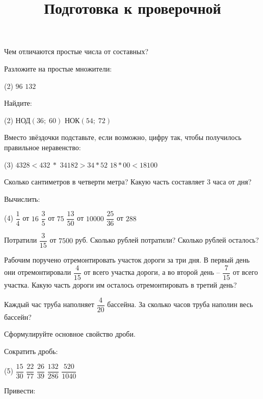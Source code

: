 \begin{class}[number=7]
	\title{Подготовка к проверочной}
	\begin{listofex}
	\item Чем отличаются простые числа от составных?
	\item Разложите на простые множители:
	\begin{tasks}(2)
		\task \( 96 \)
		\task \( 132 \)
	\end{tasks}
	\item Найдите:
	\begin{tasks}(2)
		\task НОД\( (36;\;60) \)
		\task НОК\( (54;\;72) \)
	\end{tasks}
	\item Вместо звёздочки подставьте, если возможно, цифру так, чтобы получилось правильное
	неравенство:
	\begin{tasks}(3)
		\task \( 4328 < 432\:* \)
		\task \( 34182 > 34*52 \)
		\task \( 18*00 < 18100 \)
	\end{tasks}
	\item Сколько сантиметров в четверти метра? Какую часть составляет 3 часа от дня?
	\item Вычислить:
	\begin{tasks}(4)
		\task \( \dfrac{1}{4} \) от \( 16 \)
		\task \( \dfrac{3}{5} \) от \( 75 \)
		\task \( \dfrac{13}{50} \) от \( 10000 \)
		\task \( \dfrac{25}{36} \) от \( 288 \)
	\end{tasks}
	\item Потратили \( \dfrac{3}{15} \) от \( 7500 \) руб. Сколько рублей потратили? Сколько рублей осталось?
	\item Рабочим поручено отремонтировать участок дороги за три дня. В первый день они отремонтировали \( \dfrac{4}{15} \) от всего участка дороги, а во второй день -- \( \dfrac{7}{15} \) от всего участка. Какую часть дороги им осталось отремонтировать в третий день?
	\item Каждый час труба наполняет \( \dfrac{4}{20} \) бассейна. За сколько часов труба наполин весь бассейн?
	\item Сформулируйте основное свойство дроби.
	\item Сократить дробь:
	\begin{tasks}(5)
		\task \( \dfrac{15}{30} \)
		\task \( \dfrac{22}{77} \)
		\task \( \dfrac{26}{39} \)
		\task \( \dfrac{132}{286} \)
		\task \( \dfrac{520}{1040} \)
	\end{tasks}
	\item Привести:

\end{listofex}
\end{class}
